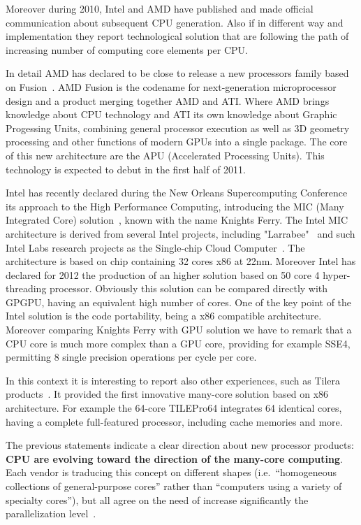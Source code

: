 Moreover during 2010, Intel and AMD have published and made official communication about subsequent CPU 
generation. Also if in different way and implementation they report technological solution that are following the path of increasing number of computing core elements per CPU.

In detail AMD has declared to be close to release a new processors family  based on Fusion~\cite{amdfusion}. AMD Fusion is the 
codename for next-generation microprocessor design and a product merging together AMD and ATI. Where AMD brings knowledge about CPU technology and ATI its own knowledge about Graphic Progessing Units, combining 
general processor execution as well as 3D geometry processing and other functions of modern GPUs into a single package. The core of this new architecture are the APU (Accelerated Processing Units).
This technology is expected to debut in the first half of 2011. 

Intel has recently declared during the New Orleans Supercomputing Conference its approach to the High Performance Computing, 
introducing the MIC (Many Integrated Core) solution~\cite{intelmic}, known with the name Knights Ferry. The Intel MIC architecture is derived from several Intel
projects, including "Larrabee"~\cite{larrabee} and such Intel Labs research projects as the Single-chip Cloud Computer~\cite{intelscc,intelsccp}. 
The architecture is based on chip containing 
32 cores x86 at 22nm. Moreover Intel has declared for 2012 the production of an higher solution based on 50 core 4 hyper-threading 
processor. Obviously this solution can be compared directly with GPGPU, having  an equivalent high number of cores. 
One of the key point of the Intel solution is the code portability, being a x86 compatible architecture. Moreover comparing Knights Ferry 
 with GPU solution we have to remark that a CPU core is much more complex than a GPU core, providing for example SSE4, permitting 8 single precision operations per cycle per core. 

In this context it is interesting to report also other experiences, such as Tilera products~\cite{Tilera}. It provided the first innovative many-core solution based on x86 architecture. For example 
the 64-core TILEPro64 integrates 64  identical cores, having a complete full-featured processor, 
including cache memories and more.

The previous  statements indicate a clear direction about new processor products: {\bf CPU are evolving toward the direction of the many-core computing}. Each vendor is traducing this concept on different shapes (i.e.\ ``homogeneous collections of general-purpose cores'' rather than ``computers using a variety of specialty cores''), 
but all agree on the need of increase significantly the parallelization
level~\cite{intelterascale}.

